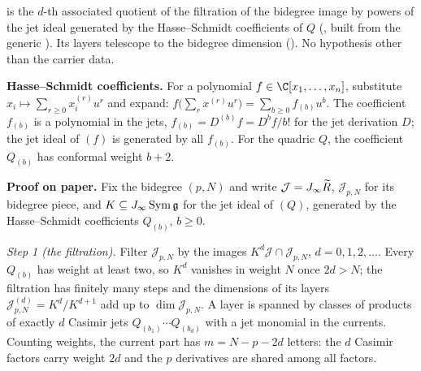 \begin{dictionary}
 is the $d$-th associated quotient of the filtration of the bidegree image by powers
of the jet ideal generated by the Hasse--Schmidt coefficients of $Q$ (, built from the
generic ). Its layers telescope to the bidegree dimension
(). No hypothesis other than the carrier data.

\textbf{Hasse--Schmidt coefficients.} For a polynomial $f\in\C[x_1,\dots,x_n]$, substitute $x_i\mapsto\sum_{r\ge0}x_i^{(r)}u^r$
and expand: $f\bigl(\sum_rx^{(r)}u^r\bigr)=\sum_{b\ge0}f_{(b)}u^b$. The coefficient $f_{(b)}$ is a polynomial in the jets,
$f_{(b)}=D^{(b)}f=D^bf/b!$ for the jet derivation $D$; the jet ideal of $(f)$ is generated by all $f_{(b)}$. For the
quadric $Q$, the coefficient $Q_{(b)}$ has conformal weight $b+2$.
\end{dictionary}

\textbf{Proof on paper.} Fix the bidegree $(p,N)$ and write $\mathcal J=J_\infty\widetilde R$, $\mathcal J_{p,N}$ for
its bidegree piece, and $K\subseteq J_\infty\operatorname{Sym}\mathfrak g$ for the jet ideal of $(Q)$, generated by the
Hasse--Schmidt coefficients $Q_{(b)}$, $b\ge0$.

\emph{Step 1 (the filtration).} Filter $\mathcal J_{p,N}$ by the images $K^d\mathcal J\cap\mathcal J_{p,N}$, $d=0,1,2,\dots$.
Every $Q_{(b)}$ has weight at least two, so $K^d$ vanishes in weight $N$ once $2d>N$; the filtration has finitely many
steps and the dimensions of its layers $\mathcal J^{(d)}_{p,N}=K^d/K^{d+1}$ add up to $\dim\mathcal J_{p,N}$. A layer is
spanned by classes of products of exactly $d$ Casimir jets $Q_{(b_1)}\cdots Q_{(b_d)}$ with a jet monomial in the currents.
Counting weights, the current part has $m=N-p-2d$ letters: the $d$ Casimir factors carry weight $2d$ and the $p$
derivatives are shared among all factors.

